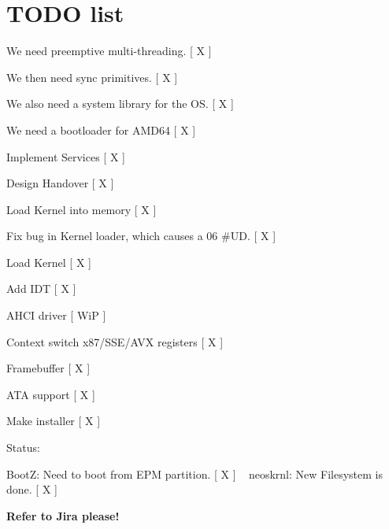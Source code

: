\chapter{TODO list}
\hypertarget{md_dev_2kernel_2doc_2_todo_list}{}\label{md_dev_2kernel_2doc_2_todo_list}
\label{md_dev_2kernel_2doc_2_todo_list_autotoc_md15}%
%

\begin{DoxyItemize}
\item We need preemptive multi-\/threading. \mbox{[} X \mbox{]}
\item We then need sync primitives. \mbox{[} X \mbox{]}
\item We also need a system library for the OS. \mbox{[} X \mbox{]}
\item We need a bootloader for AMD64 \mbox{[} X \mbox{]}
\begin{DoxyItemize}
\item Implement  Services \mbox{[} X \mbox{]}
\item Design Handover \mbox{[} X \mbox{]}
\item Load Kernel into memory \mbox{[} X \mbox{]}
\item Fix bug in Kernel loader, which causes a 06 \#\+UD. \mbox{[} X \mbox{]}
\item Load Kernel \mbox{[} X \mbox{]}
\item Add IDT \mbox{[} X \mbox{]}
\item AHCI driver \mbox{[} WiP \mbox{]}
\end{DoxyItemize}
\item Context switch x87/\+SSE/\+AVX registers \mbox{[} X \mbox{]}
\item Framebuffer \mbox{[} X \mbox{]}
\item ATA support \mbox{[} X \mbox{]}
\item Make installer \mbox{[} X \mbox{]}
\end{DoxyItemize}

Status\+:

BootZ\+: Need to boot from EPM partition. \mbox{[} X \mbox{]} ~\newline
 neoskrnl\+: New Filesystem is done. \mbox{[} X \mbox{]}

{\bfseries{Refer to Jira please!}} 